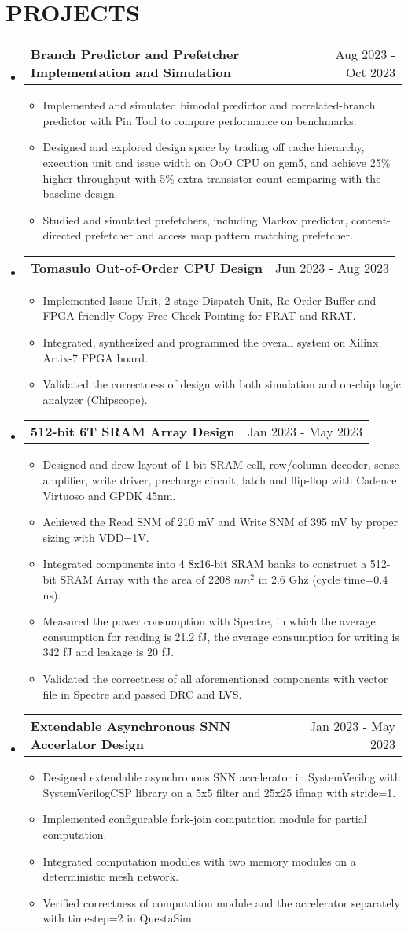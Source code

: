 \documentclass[letterpaper,11pt]{article}
\makeatletter
\newcommand{\resumeItemOne}[1]{
  \item\small{#1}
}
\newcommand{\resumeSubheadingNoTitle}[2]{
  \vspace{-1pt}\item
    \begin{tabular*}{0.97\textwidth}[t]{l@{\extracolsep{\fill}}r}
      \textbf{#1} & #2 %
    \end{tabular*}\vspace{-5pt}
}
\newcommand{\resumeSubHeadingListStart}{\begin{itemize}[leftmargin=*]}
\newcommand{\resumeSubHeadingListEnd}{\end{itemize}\vspace{-5pt}}
\newcommand{\resumeItemListStart}{\begin{itemize}}
\newcommand{\resumeItemListEnd}{\end{itemize}\vspace{-10pt}}
\makeatother
\begin{document}
\section{PROJECTS}
\resumeSubHeadingListStart
\resumeSubheadingNoTitle
    {Branch Predictor and Prefetcher Implementation and Simulation}{Aug 2023 - Oct 2023}
\resumeItemListStart
	\resumeItemOne{Implemented and simulated bimodal predictor and correlated-branch predictor with Pin Tool to compare performance on benchmarks.}
	\resumeItemOne{Designed and explored design space by trading off cache hierarchy, execution unit and issue width on OoO CPU on gem5, and achieve 25\% higher throughput with 5\% extra transistor count comparing with the baseline design.}
	\resumeItemOne{Studied and simulated prefetchers, including Markov predictor, content-directed prefetcher and access map pattern matching prefetcher.}
\resumeItemListEnd
\resumeSubheadingNoTitle
    {Tomasulo Out-of-Order CPU Design}{Jun 2023 - Aug 2023}
\resumeItemListStart
	\resumeItemOne{Implemented Issue Unit, 2-stage Dispatch Unit, Re-Order Buffer and FPGA-friendly Copy-Free Check Pointing for FRAT and RRAT.}
	\resumeItemOne{Integrated, synthesized and programmed the overall system on Xilinx Artix-7 FPGA board.}
	\resumeItemOne{Validated the correctness of design with both simulation and on-chip logic analyzer (Chipscope).}
\resumeItemListEnd
\resumeSubheadingNoTitle
    {512-bit 6T SRAM Array Design}{Jan 2023 - May 2023}
\resumeItemListStart
	\resumeItemOne{Designed and drew layout of 1-bit SRAM cell, row/column decoder, sense amplifier, write driver, precharge circuit, latch and flip-flop with Cadence Virtuoso and GPDK 45nm.}
	\resumeItemOne{Achieved the Read SNM of 210 mV and Write SNM of 395 mV by proper sizing with VDD=1V.}
	\resumeItemOne{Integrated components into 4 8x16-bit SRAM banks to construct a 512-bit SRAM Array with the area of 2208 $nm^2$ in 2.6 Ghz (cycle time=0.4 ns).}
	\resumeItemOne{Measured the power consumption with Spectre, in which the average consumption for reading is 21.2 fJ, the average consumption for writing is 342 fJ and leakage is 20 fJ.}
	\resumeItemOne{Validated the correctness of all aforementioned components with vector file in Spectre and passed DRC and LVS.}
\resumeItemListEnd
\resumeSubheadingNoTitle
    {Extendable Asynchronous SNN Accerlator Design}{Jan 2023 - May 2023}
\resumeItemListStart
	\resumeItemOne{Designed extendable asynchronous SNN accelerator in SystemVerilog with SystemVerilogCSP library on a 5x5 filter and 25x25 ifmap with stride=1.}
	\resumeItemOne{Implemented configurable fork-join computation module for partial computation.}
	\resumeItemOne{Integrated computation modules with two memory modules on a deterministic mesh network.}
	\resumeItemOne{Verified correctness of computation module and the accelerator separately with timestep=2 in QuestaSim.}
\resumeItemListEnd
\resumeSubHeadingListEnd
\end{document}
